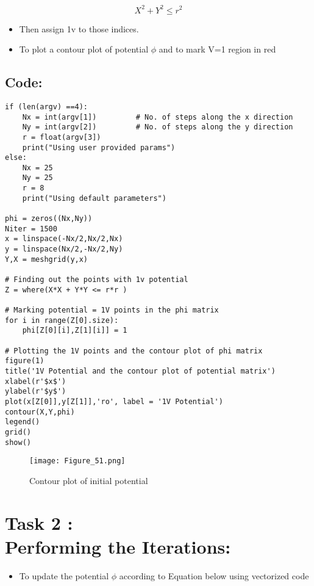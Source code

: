 \documentclass[11pt, a4paper, twoside]{article}
\begin{document}
\begin{equation}
X ^2 +Y ^2 \leq	 r^2
\end{equation}

\begin{itemize}
\item
  Then assign 1v to those indices.
\item
  To plot a contour plot of potential \(\phi\) and to mark V=1 region in
  red
\end{itemize}

\subsection*{Code:}
\begin{verbatim}
if (len(argv) ==4):
    Nx = int(argv[1])         # No. of steps along the x direction
    Ny = int(argv[2])         # No. of steps along the y direction
    r = float(argv[3])
    print("Using user provided params")
else:
    Nx = 25
    Ny = 25  
    r = 8
    print("Using default parameters") 

phi = zeros((Nx,Ny))
Niter = 1500
x = linspace(-Nx/2,Nx/2,Nx)
y = linspace(Nx/2,-Nx/2,Ny)
Y,X = meshgrid(y,x)

# Finding out the points with 1v potential
Z = where(X*X + Y*Y <= r*r )

# Marking potential = 1V points in the phi matrix 
for i in range(Z[0].size):
    phi[Z[0][i],Z[1][i]] = 1
  
# Plotting the 1V points and the contour plot of phi matrix
figure(1) 
title('1V Potential and the contour plot of potential matrix')
xlabel(r'$x$')
ylabel(r'$y$')
plot(x[Z[0]],y[Z[1]],'ro', label = '1V Potential')
contour(X,Y,phi)
legend()
grid()
show()   
\end{verbatim}

	     \begin{figure}[!tbh]
        \centering
        \texttt{[image: Figure\_51.png]}  
        \caption{Contour plot of initial potential}
   \end{figure}
   
  
  
\section*{Task 2 : \\Performing the Iterations:}

\begin{itemize}
   \item To update the potential \(\phi\) according to Equation below using
     vectorized code
   \end{itemize}
   
\end{document}
